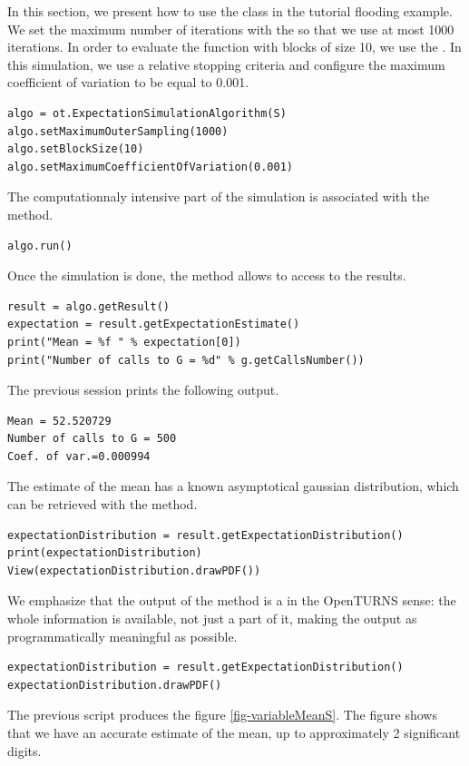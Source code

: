 \documentclass{article}
\begin{document}
In this section, we present how to use the  class 
in the tutorial flooding example. 
We set the maximum number of iterations with the  so that 
we use at most 1000 iterations. 
In order to evaluate the function with blocks of size 10, we use the . 
In this simulation, we use a relative stopping criteria and configure the 
maximum coefficient of variation to be equal to 0.001.
\begin{lstlisting}
algo = ot.ExpectationSimulationAlgorithm(S)
algo.setMaximumOuterSampling(1000)
algo.setBlockSize(10)
algo.setMaximumCoefficientOfVariation(0.001)
\end{lstlisting}
The computationnaly intensive part of the simulation is associated with the 
 method. 
\begin{lstlisting}
algo.run()
\end{lstlisting}
Once the simulation is done, the  method allows to 
access to the results.
\begin{lstlisting}
result = algo.getResult()
expectation = result.getExpectationEstimate()
print("Mean = %f " % expectation[0])
print("Number of calls to G = %d" % g.getCallsNumber())
\end{lstlisting}
The previous session prints the following output.
\begin{lstlisting}
Mean = 52.520729 
Number of calls to G = 500
Coef. of var.=0.000994
\end{lstlisting}
The estimate of the mean has a known asymptotical gaussian distribution, which can be retrieved 
with the  method.
\begin{lstlisting}
expectationDistribution = result.getExpectationDistribution()
print(expectationDistribution)
View(expectationDistribution.drawPDF())
\end{lstlisting}
We emphasize that the output of the  method is 
a  in the OpenTURNS sense: the whole information is available, 
not just a part of it, making the output as programmatically meaningful as possible. 
\begin{lstlisting}
expectationDistribution = result.getExpectationDistribution()
expectationDistribution.drawPDF()
\end{lstlisting}
The previous script produces the figure \ref{fig-variableMeanS}. 
The figure shows that we have an accurate estimate of the mean, 
up to approximately 2 significant digits. 
\end{document}
